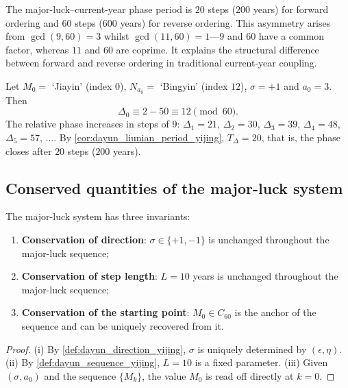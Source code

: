 \begin{remark}\label{rem:dayun_asymmetry_yijing}
The major-luck--current-year phase period is $20$ steps ($200$ years) for forward ordering and $60$ steps ($600$ years) for reverse ordering. This asymmetry arises from $\gcd(9,60)=3$ whilst $\gcd(11,60)=1$---$9$ and $60$ have a common factor, whereas $11$ and $60$ are coprime. It explains the structural difference between forward and reverse ordering in traditional current-year coupling.
\end{remark}

\begin{example}\label{ex:dayun_liunian_closure_yijing}
\leavevmode\par\noindent
Let $M_0=$ `Jiayin' (index $0$), $N_{a_0}=$ `Bingyin' (index $12$), $\sigma=+1$ and $a_0=3$. Then
\[
\Delta_0\equiv 2-50\equiv 12\pmod{60}.
\]
The relative phase increases in steps of $9$: $\Delta_1=21$, $\Delta_2=30$, $\Delta_3=39$, $\Delta_4=48$, $\Delta_5=57$, $\dots$. By \cref{cor:dayun_liunian_period_yijing}, $T_\Delta=20$, that is, the phase closes after $20$ steps ($200$ years).
\end{example}

\subsection{Conserved quantities of the major-luck system}

\begin{theorem}\label{thm:dayun_conservation_yijing}
The major-luck system has three invariants:
\begin{enumerate}[label=(\roman*)]
    \item \textbf{Conservation of direction}: $\sigma\in\{+1,-1\}$ is unchanged throughout the major-luck sequence;
    \item \textbf{Conservation of step length}: $L=10$ years is unchanged throughout the major-luck sequence;
    \item \textbf{Conservation of the starting point}: $M_0\in C_{60}$ is the anchor of the sequence and can be uniquely recovered from it.
\end{enumerate}
\end{theorem}

\begin{proof}
(i) By \cref{def:dayun_direction_yijing}, $\sigma$ is uniquely determined by $(\epsilon,\eta)$.
(ii) By \cref{def:dayun_sequence_yijing}, $L=10$ is a fixed parameter.
(iii) Given $(\sigma,a_0)$ and the sequence $\{M_k\}$, the value $M_0$ is read off directly at $k=0$.
\end{proof}

